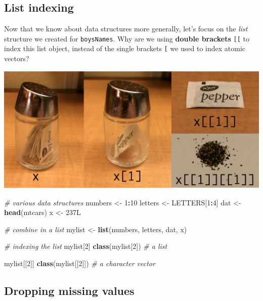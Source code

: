 \documentclass[
]{book}
\newenvironment{Shaded}{\begin{snugshade}}{\end{snugshade}}
\newcommand{\CommentTok}[1]{\textcolor[rgb]{0.56,0.35,0.01}{\textit{#1}}}
\newcommand{\DecValTok}[1]{\textcolor[rgb]{0.00,0.00,0.81}{#1}}
\newcommand{\KeywordTok}[1]{\textcolor[rgb]{0.13,0.29,0.53}{\textbf{#1}}}
\newcommand{\NormalTok}[1]{#1}
\newcommand{\OperatorTok}[1]{\textcolor[rgb]{0.81,0.36,0.00}{\textbf{#1}}}
\newcommand{\StringTok}[1]{\textcolor[rgb]{0.31,0.60,0.02}{#1}}
\begin{document}
\hypertarget{list-indexing}{%
\subsection{List indexing}\label{list-indexing}}

Now that we know about data structures more generally, let's focus on the \emph{list} structure we created for \texttt{boysNames}.
Why are we using \textbf{double brackets} \texttt{{[}{[}} to index this list object, instead of the single brackets \texttt{{[}} we used to index atomic vectors?

\includegraphics{R/RDataWrangling/images/indexing_lists.png}

\begin{Shaded}
\begin{Highlighting}[]
\CommentTok{# various data structures}
\NormalTok{numbers <-}\StringTok{ }\DecValTok{1}\OperatorTok{:}\DecValTok{10}
\NormalTok{letters <-}\StringTok{ }\NormalTok{LETTERS[}\DecValTok{1}\OperatorTok{:}\DecValTok{4}\NormalTok{]}
\NormalTok{dat <-}\StringTok{ }\KeywordTok{head}\NormalTok{(mtcars)}
\NormalTok{x <-}\StringTok{ }\NormalTok{237L}

\CommentTok{# combine in a list}
\NormalTok{mylist <-}\StringTok{ }\KeywordTok{list}\NormalTok{(numbers, letters, dat, x)}

\CommentTok{# indexing the list}
\NormalTok{mylist[}\DecValTok{2}\NormalTok{]}
\KeywordTok{class}\NormalTok{(mylist[}\DecValTok{2}\NormalTok{]) }\CommentTok{# a list}

\NormalTok{mylist[[}\DecValTok{2}\NormalTok{]]}
\KeywordTok{class}\NormalTok{(mylist[[}\DecValTok{2}\NormalTok{]]) }\CommentTok{# a character vector}
\end{Highlighting}
\end{Shaded}

\hypertarget{dropping-missing-values}{%
\subsection{Dropping missing values}\label{dropping-missing-values}}
\end{document}
